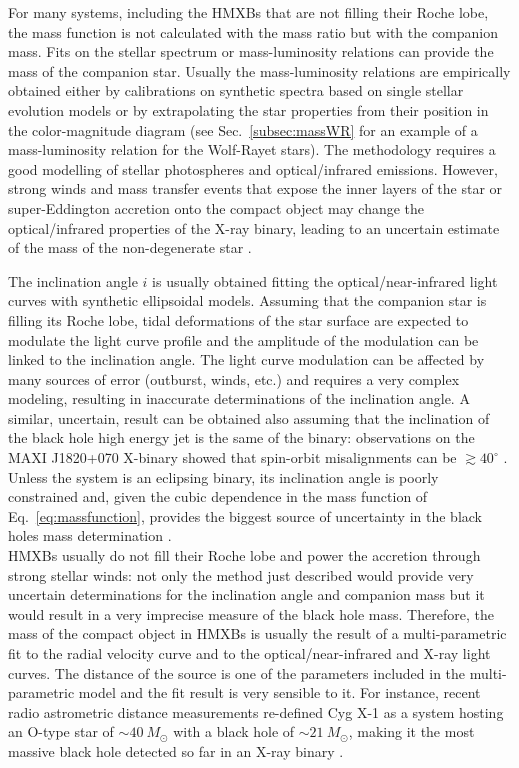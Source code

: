 \documentclass[a4paper,titlepage]{book}     	%
\newcommand{\sun}{\ensuremath{_\odot}}
\newcommand{\msun}{\ensuremath{M\sun}}
\begin{document}
For many systems, including the HMXBs that are not filling their Roche lobe, the mass function is not calculated with the mass ratio but with the companion mass. Fits on the stellar spectrum or mass-luminosity relations can provide the mass of the companion star. Usually the mass-luminosity relations are empirically obtained either by calibrations on synthetic spectra based on single stellar evolution models or by extrapolating the star properties from their position in the color-magnitude diagram (see Sec.\ \ref{subsec:massWR} for an example of a mass-luminosity relation for the Wolf-Rayet stars). The methodology requires a good modelling of stellar photospheres and optical/infrared emissions. However, strong winds and mass transfer events that expose the inner layers of the star or super-Eddington accretion onto the compact object may change the optical/infrared properties of the X-ray binary, leading to an uncertain estimate of the mass of the non-degenerate star \cite{superEddingtonaccBH_Ambrosi2018}. 

The inclination angle $i$ is usually obtained fitting the optical/near-infrared light curves with synthetic ellipsoidal models. Assuming that the companion star is filling its Roche lobe, tidal deformations of the star surface are expected to modulate the light curve profile and the amplitude of the modulation can be linked to the inclination angle. The light curve modulation can be affected by many sources of error (outburst, winds, etc.) and requires a very complex modeling, resulting in inaccurate determinations of the inclination angle. A similar, uncertain, result can be obtained also assuming that the inclination of the black hole high energy jet is the same of the binary: observations on the MAXI J1820+070 X-binary showed that spin-orbit misalignments can be $\gtrsim 40^{\circ}$ \cite{BHspinmisaligned_2022}. Unless the system is an eclipsing binary, its inclination angle is poorly constrained and, given the cubic dependence in the mass function of Eq.\ \ref{eq:massfunction}, provides the biggest source of uncertainty in the black holes mass determination \cite{Xbinaries_massmeasure}.\\


HMXBs usually do not fill their Roche lobe and power the accretion through strong stellar winds: not only the method just described would provide very uncertain determinations for the inclination angle and companion mass but it would result in a very imprecise measure of the black hole mass. Therefore, the mass of the compact object in HMXBs is usually the result of a multi-parametric fit to the radial velocity curve and to the optical/near-infrared and X-ray light curves. The distance of the source is one of the parameters included in the multi-parametric model and the fit result is very sensible to it. For instance, recent radio astrometric distance measurements re-defined Cyg X-1 as a system hosting an O-type star of $\sim 40~\msun$ with a black hole of $\sim 21~\msun$, making it the most massive black hole detected so far in an X-ray binary \cite{cygnusx1}.
\end{document}

